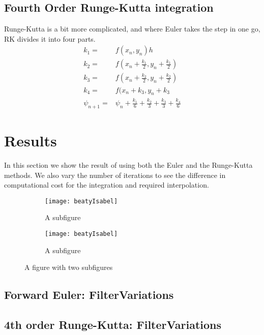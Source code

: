 \documentclass[11pt,a4paper,english]{article}
\numberwithin{equation}{section}
\begin{document}
\subsection{Fourth Order Runge-Kutta integration}
Runge-Kutta is a bit more complicated, and where Euler takes the step in one go, RK divides it into four parts.
\begin{align*}
	k_1 =& f(x_n, y_n)h	\\
	k_2 =& f(x_n + \frac{k_1}{2}, y_n + \frac{k_1}{2})	\\
	k_3 =& f(x_n + \frac{k_2}{2}, y_n + \frac{k_2}{2})	\\
	k_4 =& f(x_n + k_3, y_n + k_3	\\	
	\psi_{n+1} =& \psi_n + \frac{k_1}{6} + \frac{k_2}{3} + \frac{k_3}{3} + \frac{k_4}{6}
\end{align*}


\section{Results}
In this section we show the result of using both the Euler and the Runge-Kutta methods. We also vary the number of iterations to see the difference in computational cost for the integration and required interpolation.

\begin{figure}[ht]
\centering
\hspace*{-2.5cm}
\begin{subfigure}{.7\textwidth}
  \centering
  \texttt{[image: beatyIsabel]}
  \caption{A subfigure}
  \label{fig:sub1}
\end{subfigure}%
\begin{subfigure}{.7\textwidth}
  \centering
  \texttt{[image: beatyIsabel]}
  \caption{A subfigure}
  \label{fig:sub2}
\end{subfigure}
\caption{A figure with two subfigures}
\label{fig:test}
\end{figure}



\subsection{Forward Euler: FilterVariations}


\subsection{4th order Runge-Kutta: FilterVariations}
\end{document}
